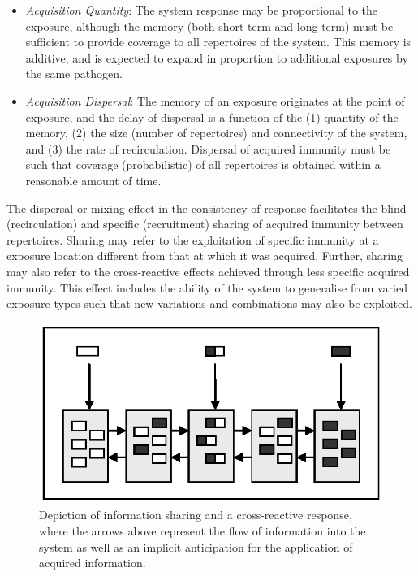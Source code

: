 \begin{itemize}
	\item \emph{Acquisition Quantity}: The system response may be proportional to the exposure, although the memory (both short-term and long-term) must be sufficient to provide coverage to all repertoires of the system. This memory is additive, and is expected to expand in proportion to additional exposures by the same pathogen. 
	\item \emph{Acquisition Dispersal}: The memory of an exposure originates at the point of exposure, and the delay of dispersal is a function of the (1) quantity of the memory, (2) the size (number of repertoires) and connectivity of the system, and (3) the rate of recirculation. Dispersal of acquired immunity must be such that coverage (probabilistic) of all repertoires is obtained within a reasonable amount of time.
\end{itemize}

The dispersal or mixing effect in the consistency of response facilitates the blind (recirculation) and specific (recruitment) sharing of acquired immunity between repertoires. Sharing may refer to the exploitation of specific immunity at a exposure location different from that at which it was acquired. Further, sharing may also refer to the cross-reactive effects achieved through less specific acquired immunity. This effect includes the ability of the system to generalise from varied exposure types such that new variations and combinations may also be exploited.

\begin{figure}[ht]
	\centering
	\includegraphics[scale=0.75]{Tissues/tissues-effects-sharing}
	\caption{Depiction of information sharing and a cross-reactive response, where the arrows above represent the flow of information into the system as well as an implicit anticipation for the application of acquired information.}
	\label{fig:tissues:effects:sharing}
\end{figure}

